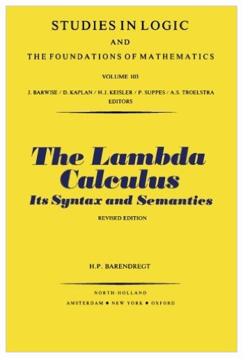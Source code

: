 \documentclass[pdf]{beamer}
\begin{document}
\begin{frame}
\begin{itemize}
\begin{figure}[!tbp]
\begin{minipage}[b]{0.15\textwidth}
        \includegraphics[width=\textwidth]{libro-barendregt.jpg}
      \end{minipage}
      \hfill
      \begin{minipage}[b]{0.15\textwidth}

\end{minipage}
\end{figure}
\end{itemize}
\end{frame}
\end{document}
